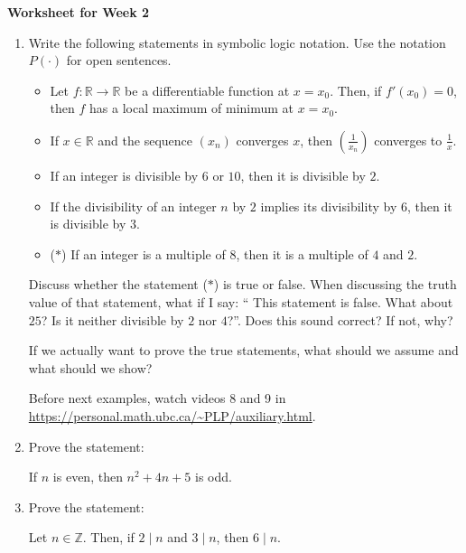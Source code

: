 \documentclass[12pt]{article}
\begin{document}
\centerline{\bf\large Worksheet for Week 2}

\vspace{25pt}


\begin{enumerate}

\item Write the following statements in symbolic logic notation. Use the notation $P(\cdot)$ for open sentences.

\begin{itemize}

\item {\color{red} Let $f:\mathbb R \to \mathbb R$ be a differentiable function at $x=x_0$. Then, if $f'(x_0)=0$, then $f$ has a local maximum of minimum at $x=x_0$}.

\item If $x\in\mathbb R$ and the sequence $(x_n)$ converges $x$, then $(\frac{1}{x_n})$ converges to $\frac{1}{x}$.

\item {\color{red} If an integer is divisible by $6$ or $10$, then it is divisible by $2$}.

\item If the divisibility of an integer $n$ by $2$ implies its divisibility by $6$, then it is divisible by $3$.

\item {\color{red}($\ast$) If an integer is a multiple of $8$, then it is a multiple of $4$ and $2$}.

\end{itemize}

Discuss whether the statement ($\ast$) is true or false. When discussing the truth value of that statement, what if I say: `` This statement is false. What about $25$? Is it neither divisible by $2$ nor $4$?''. Does this sound correct? If not, why?

 If we actually want to prove the true statements, what should we assume and what should we show?
 
 Before next examples, watch videos 8 and 9 in \url{https://personal.math.ubc.ca/~PLP/auxiliary.html}.

\item  Prove the statement:
\begin{center}
If $n$ is even, then $n^2+4n+5$ is odd.
\end{center}


\item Prove the statement:
\begin{center}
Let $n\in\mathbb Z$. Then, if $2\mid n$ and $3\mid n$, then $6\mid n$.
\end{center}


\end{enumerate}
\end{document}
